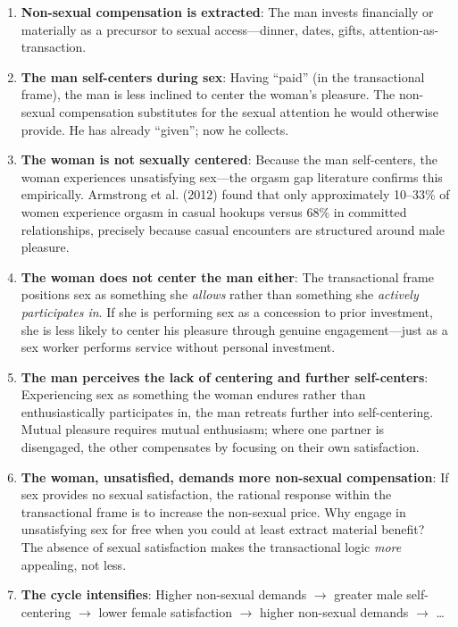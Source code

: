 \documentclass[12pt, letterpaper]{article}
\begin{document}
\begin{enumerate}
    \item \textbf{Non-sexual compensation is extracted}: The man invests financially or materially as a precursor to sexual access---dinner, dates, gifts, attention-as-transaction.
    
    \item \textbf{The man self-centers during sex}: Having ``paid'' (in the transactional frame), the man is less inclined to center the woman's pleasure. The non-sexual compensation substitutes for the sexual attention he would otherwise provide. He has already ``given''; now he collects.
    
    \item \textbf{The woman is not sexually centered}: Because the man self-centers, the woman experiences unsatisfying sex---the orgasm gap literature confirms this empirically. Armstrong et al. (2012) found that only approximately 10--33\% of women experience orgasm in casual hookups versus 68\% in committed relationships, precisely because casual encounters are structured around male pleasure.
    
    \item \textbf{The woman does not center the man either}: The transactional frame positions sex as something she \textit{allows} rather than something she \textit{actively participates in}. If she is performing sex as a concession to prior investment, she is less likely to center his pleasure through genuine engagement---just as a sex worker performs service without personal investment.
    
    \item \textbf{The man perceives the lack of centering and further self-centers}: Experiencing sex as something the woman endures rather than enthusiastically participates in, the man retreats further into self-centering. Mutual pleasure requires mutual enthusiasm; where one partner is disengaged, the other compensates by focusing on their own satisfaction.
    
    \item \textbf{The woman, unsatisfied, demands more non-sexual compensation}: If sex provides no sexual satisfaction, the rational response within the transactional frame is to increase the non-sexual price. Why engage in unsatisfying sex for free when you could at least extract material benefit? The absence of sexual satisfaction makes the transactional logic \textit{more} appealing, not less.
    
    \item \textbf{The cycle intensifies}: Higher non-sexual demands $\rightarrow$ greater male self-centering $\rightarrow$ lower female satisfaction $\rightarrow$ higher non-sexual demands $\rightarrow$ \ldots
\end{enumerate}
\end{document}

